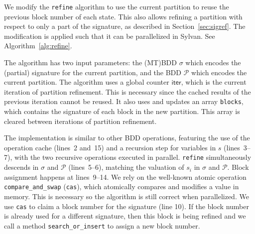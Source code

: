 We modify the \texttt{refine} algorithm to use the current partition to reuse the previous block number of each state.
%
%
This also allows refining a partition with respect to only a part of the signature, as described in Section~\ref{sec:sigref}.
%
%
The modification is applied such that it can be parallelized in Sylvan.
%
%
See Algorithm~\ref{alg:refine}.


The algorithm has two input parameters: the (MT)BDD $\sigma$ which encodes the (partial) signature for the current partition, and the BDD $\mathcal{P}$ which encodes the current partition.
%
%
%
%
The algorithm uses a global counter $\textsf{iter}$, which is the current iteration of partition refinement.
%
%
This is necessary since the cached results of the previous iteration cannot be reused.
%
%
It also uses and updates an array \texttt{blocks}, which contains the signature of each block in the new partition.
%
This array is cleared between iterations of partition refinement.


The implementation is similar to other BDD operations, featuring the use of the operation cache (lines~2 and~15) and a recursion step for variables in $s$ (lines~3--7), with the two recursive operations executed in parallel.
%
\texttt{refine} simultaneously descends in $\sigma$ and $\mathcal{P}$ (lines~5--6), matching the valuation of $s_i$ in $\sigma$ and $\mathcal{P}$.
%
%
Block assignment happens at lines~9--14.
%
We rely on the well-known atomic operation \texttt{compare\_and\_swap} (\texttt{cas}), which atomically compares and modifies a value in memory.
%
This is necessary so the algorithm is still correct when parallelized.
%
%
We use \texttt{cas} to claim a block number for the signature (line 10).
%
%
If the block number is already used for a different signature, then this block is being refined and we call a method \texttt{search\_or\_insert} to assign a new block number.
%
%
%
%
%

